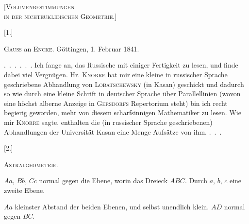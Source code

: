 \clearpage
{}%
\begin{center}
{\Large\textsc{[Volumenbestimmungen\\ in der nichteuklidischen Geometrie.]}}



[1.]

\textsc{Gauss} an \textsc{Encke}. Göttingen, 1. Februar 1841.
\end{center}


\mbox{.\ .\ .\ .\ .\ .} Ich fange an, das Russische mit einiger Fertigkeit zu lesen, und
finde dabei viel Vergnügen. Hr. \textsc{Knorre} hat mir eine kleine in russischer
Sprache geschriebene Abhandlung von \textsc{Lobatschewsky} (in Kasan) geschickt und
dadurch so wie durch eine kleine Schrift in deutscher Sprache über Parallellinien
(wovon eine höchst alberne Anzeige in \textsc{Gersdorfs} Repertorium steht) bin ich
recht begierig geworden, mehr von diesem scharfsinnigen Mathematiker zu lesen. Wie mir
\textsc{Knorre} sagte, enthalten die (in russischer Sprache geschriebenen)
Abhandlungen der Universität Kasan eine Menge Aufsätze von ihm. \mbox{.\ .\ .}

\begin{center}


[2.]

\textsc{Astralgeometrie.}
\end{center}

\begin{center}\end{center}


$Aa$, $Bb$, $Cc$ normal gegen die Ebene, worin das Dreieck $ABC$. Durch $a$, $b$, $c$
eine zweite Ebene.


$Aa$ kleinster Abstand der beiden Ebenen, und selbst unendlich klein. $AD$ normal
gegen $BC$.
